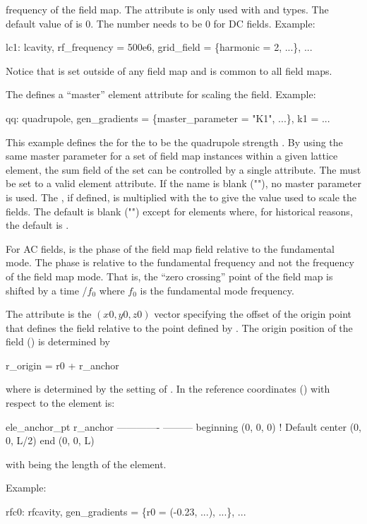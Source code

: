 \begin{description}
frequency of the field map. The  attribute is only used with  and
 types. The default value of  is 0.  The  number needs to
be 0 for DC fields. Example:
\begin{example}
  lc1: lcavity, rf_frequency = 500e6, grid_field = \{harmonic = 2, ...\}, ...
\end{example}
Notice that  is set outside of any field map and is common to all field maps.
  \item[master_parameter] \Newline
The  defines a ``master'' element attribute for scaling the field. Example:
\begin{example}
  qq: quadrupole, gen_gradients = \{master_parameter = "K1", ...\}, k1 = ...
\end{example}
This example defines the  for the  to be the
quadrupole strength . By using the same master parameter for a set of field map
instances within a given lattice element, the sum field of the set can be controlled by a
single attribute. The  must be set to a valid element attribute. If
the name is blank (""), no master parameter is used. The , if
defined, is multiplied with the  to give the value used to scale the
fields. The default  is blank ("") except for  elements
where, for historical reasons, the default is .
%
\item[phi0_fieldmap] \Newline
For AC fields,  is the phase of the field map field relative to the fundamental
mode. The phase  is relative to the fundamental frequency and not the frequency of
the field map mode. That is, the ``zero crossing'' point of the field map is shifted by a time
/$f_0$ where $f_0$ is the fundamental mode frequency.
%
\item[r0] \Newline
The  attribute is the $(x0, y0, z0)$ vector specifying the offset of the origin point that
defines the field relative to the  point defined by .  The origin
position of the field () is determined by
\begin{example}
  r_origin = r0 + r_anchor
\end{example}
where  is determined by the setting of . In the reference
coordinates () with respect to the element  is:
\begin{example}
  ele_anchor_pt       r_anchor
  -------------       ---------
  beginning           (0, 0, 0)      ! Default
  center              (0, 0, L/2)
  end                 (0, 0, L)
\end{example}
with  being the length of the element. 

Example:
\begin{example}
  rfc0: rfcavity, gen_gradients = \{r0 = (-0.23, ...), ...\}, ...
\end{example}
  \end{description}

